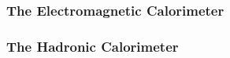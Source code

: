 \subsubsection{The Electromagnetic Calorimeter} \label{sec:ECAL}

\subsubsection{The Hadronic Calorimeter} \label{sec:HCAL}
